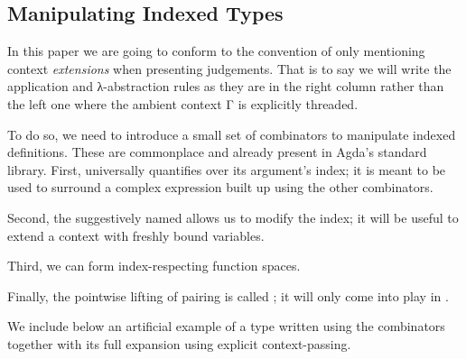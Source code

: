 
\subsection{Manipulating Indexed Types}

In this paper we are going to conform to the convention
of only mentioning context \emph{extensions} when
presenting judgements.
%
That is to say we will write the application and
λ-abstraction rules as they are in the right column
rather than the left one where the ambient context Γ
is explicitly threaded.

\noindent
\begin{minipage}{.2\textwidth}
\end{minipage}\hfill
\begin{minipage}{.2\textwidth}
\end{minipage}

To do so, we need to introduce a small set of combinators
to manipulate indexed definitions. These are commonplace
and already present in Agda's standard library.
%
First,  universally quantifies over its argument's index;
it is meant to be used to surround a complex expression built
up using the other combinators.


Second, the suggestively named  allows us to modify
the index; it will be useful to extend a context with freshly
bound variables.


Third, we can form index-respecting function spaces.


Finally, the pointwise lifting of pairing is called ;
it will only come into play in .


We include below an artificial example of a type written using
the combinators together with its full expansion using explicit
context-passing.

